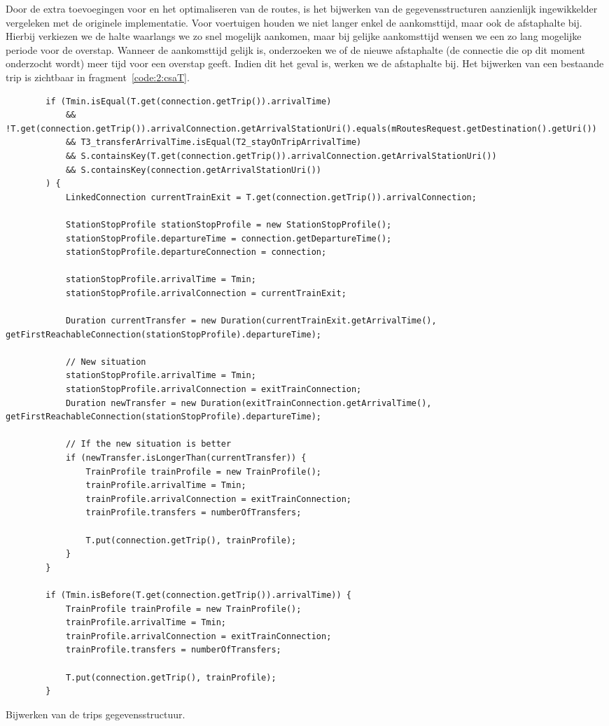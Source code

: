 Door de extra toevoegingen voor  en het optimaliseren van de routes, is het bijwerken van de gegevensstructuren aanzienlijk ingewikkelder vergeleken met de originele implementatie. Voor voertuigen houden we niet langer enkel de aankomsttijd, maar ook de afstaphalte bij. Hierbij verkiezen we de halte waarlangs we zo snel mogelijk aankomen, maar bij gelijke aankomsttijd wensen we een zo lang mogelijke periode voor de overstap. Wanneer de aankomsttijd gelijk is, onderzoeken we of de nieuwe afstaphalte (de connectie die op dit moment onderzocht wordt) meer tijd voor een overstap geeft. Indien dit het geval is, werken we de afstaphalte bij. Het bijwerken van een bestaande trip is zichtbaar in fragment~\ref{code:2:csaT}.

\begin{listing}[h]
	\begin{verbatim}
        if (Tmin.isEqual(T.get(connection.getTrip()).arrivalTime)
			&& !T.get(connection.getTrip()).arrivalConnection.getArrivalStationUri().equals(mRoutesRequest.getDestination().getUri())
			&& T3_transferArrivalTime.isEqual(T2_stayOnTripArrivalTime)
			&& S.containsKey(T.get(connection.getTrip()).arrivalConnection.getArrivalStationUri())
			&& S.containsKey(connection.getArrivalStationUri())
		) {
			LinkedConnection currentTrainExit = T.get(connection.getTrip()).arrivalConnection;
	
			StationStopProfile stationStopProfile = new StationStopProfile();
			stationStopProfile.departureTime = connection.getDepartureTime();
			stationStopProfile.departureConnection = connection;
		
			stationStopProfile.arrivalTime = Tmin;
			stationStopProfile.arrivalConnection = currentTrainExit;
			
			Duration currentTransfer = new Duration(currentTrainExit.getArrivalTime(), getFirstReachableConnection(stationStopProfile).departureTime);
			
			// New situation
			stationStopProfile.arrivalTime = Tmin;
			stationStopProfile.arrivalConnection = exitTrainConnection;
			Duration newTransfer = new Duration(exitTrainConnection.getArrivalTime(), getFirstReachableConnection(stationStopProfile).departureTime);
			
			// If the new situation is better
			if (newTransfer.isLongerThan(currentTransfer)) {
				TrainProfile trainProfile = new TrainProfile();
				trainProfile.arrivalTime = Tmin;
				trainProfile.arrivalConnection = exitTrainConnection;
				trainProfile.transfers = numberOfTransfers;
				
				T.put(connection.getTrip(), trainProfile);
			}
		}
			
		if (Tmin.isBefore(T.get(connection.getTrip()).arrivalTime)) {
			TrainProfile trainProfile = new TrainProfile();
			trainProfile.arrivalTime = Tmin;
			trainProfile.arrivalConnection = exitTrainConnection;
			trainProfile.transfers = numberOfTransfers;
			
			T.put(connection.getTrip(), trainProfile);
		}
	\end{verbatim}
	\caption[CSA: Bijwerken T]{Bijwerken van de trips gegevensstructuur.}
	\label{code:2:csaT}
\end{listing}

